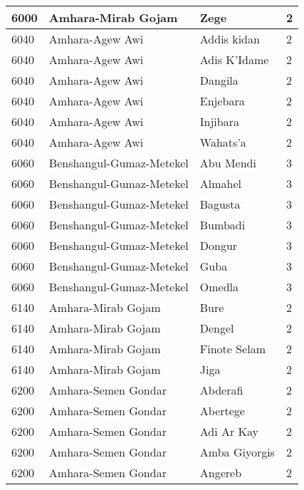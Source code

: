 \documentclass[12pt,a4paper,openbib,titlepage]{report}
\begin{document}
\begin{longtable}{|p{2cm}|p{6.5cm}|p{8cm}|p{1.5cm}|}
\hline 
\rule[-1ex]{0pt}{2.5ex} 6000 & Amhara-Mirab Gojam & Zege & 2 \\
\hline 
\rule[-1ex]{0pt}{2.5ex} 6040 & Amhara-Agew Awi & Addis kidan & 2 \\
\hline 
\rule[-1ex]{0pt}{2.5ex} 6040 & Amhara-Agew Awi & Adis K'Idame & 2 \\
\hline 
\rule[-1ex]{0pt}{2.5ex} 6040 & Amhara-Agew Awi & Dangila & 2 \\
\hline 
\rule[-1ex]{0pt}{2.5ex} 6040 & Amhara-Agew Awi & Enjebara & 2 \\
\hline 
\rule[-1ex]{0pt}{2.5ex} 6040 & Amhara-Agew Awi & Injibara & 2 \\
\hline 
\rule[-1ex]{0pt}{2.5ex} 6040 & Amhara-Agew Awi & Wahats'a & 2 \\
\hline 
\rule[-1ex]{0pt}{2.5ex} 6060 & Benshangul-Gumaz-Metekel & Abu Mendi & 3 \\
\hline 
\rule[-1ex]{0pt}{2.5ex} 6060 & Benshangul-Gumaz-Metekel & Almahel & 3 \\
\hline 
\rule[-1ex]{0pt}{2.5ex} 6060 & Benshangul-Gumaz-Metekel & Bagusta & 3 \\
\hline 
\rule[-1ex]{0pt}{2.5ex} 6060 & Benshangul-Gumaz-Metekel & Bumbadi & 3 \\
\hline 
\rule[-1ex]{0pt}{2.5ex} 6060 & Benshangul-Gumaz-Metekel & Dongur & 3 \\
\hline 
\rule[-1ex]{0pt}{2.5ex} 6060 & Benshangul-Gumaz-Metekel & Guba & 3 \\
\hline 
\rule[-1ex]{0pt}{2.5ex} 6060 & Benshangul-Gumaz-Metekel & Omedla & 3 \\
\hline 
\rule[-1ex]{0pt}{2.5ex} 6140 & Amhara-Mirab Gojam & Bure & 2 \\
\hline 
\rule[-1ex]{0pt}{2.5ex} 6140 & Amhara-Mirab Gojam & Dengel & 2 \\
\hline 
\rule[-1ex]{0pt}{2.5ex} 6140 & Amhara-Mirab Gojam & Finote Selam & 2 \\
\hline 
\rule[-1ex]{0pt}{2.5ex} 6140 & Amhara-Mirab Gojam & Jiga & 2 \\
\hline 
\rule[-1ex]{0pt}{2.5ex} 6200 & Amhara-Semen Gondar & Abderafi & 2 \\
\hline 
\rule[-1ex]{0pt}{2.5ex} 6200 & Amhara-Semen Gondar & Abertege & 2 \\
\hline 
\rule[-1ex]{0pt}{2.5ex} 6200 & Amhara-Semen Gondar & Adi Ar Kay & 2 \\
\hline 
\rule[-1ex]{0pt}{2.5ex} 6200 & Amhara-Semen Gondar & Amba Giyorgis & 2 \\
\hline 
\rule[-1ex]{0pt}{2.5ex} 6200 & Amhara-Semen Gondar & Angereb & 2 \\

\end{longtable}
\end{document}
